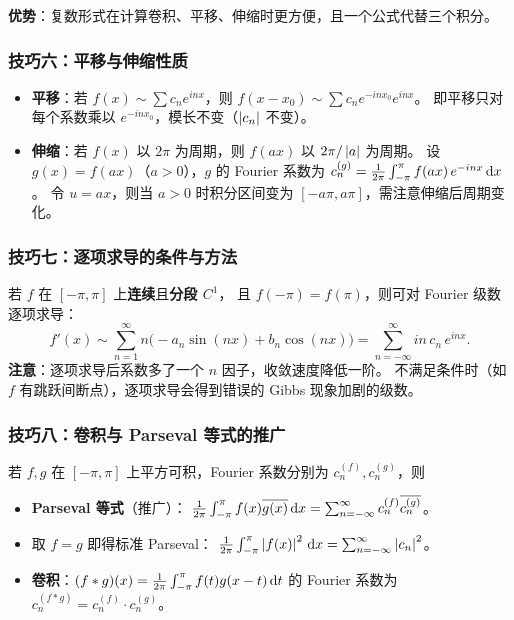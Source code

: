 \documentclass{ctexart}
\begin{document}
\textbf{优势}：复数形式在计算卷积、平移、伸缩时更方便，且一个公式代替三个积分。

\subsubsection*{技巧六：平移与伸缩性质}
\begin{itemize}
  \item \textbf{平移}：若 $f(x) \sim \sum c_n e^{inx}$，则
    $f(x - x_0) \sim \sum c_n e^{-inx_0} e^{inx}$。
    即平移只对每个系数乘以 $e^{-inx_0}$，模长不变（$\left| c_n \right|$ 不变）。
  \item \textbf{伸缩}：若 $f(x)$ 以 $2\pi$ 为周期，则 $f(ax)$ 以 $2\pi/\left| a \right|$ 为周期。
    设 $g(x) = f(ax)$（$a > 0$），$g$ 的 Fourier 系数为
    $c_n^{(g)} = \frac{1}{2\pi}\int_{-\pi}^{\pi} f(ax)\,e^{-inx}\,\mathrm{d} x$。
    令 $u = ax$，则当 $a > 0$ 时积分区间变为 $[-a\pi, a\pi]$，需注意伸缩后周期变化。
\end{itemize}

\subsubsection*{技巧七：逐项求导的条件与方法}
若 $f$ 在 $[-\pi,\pi]$ 上\textbf{连续}且\textbf{分段 $C^1$}，
且 $f(-\pi) = f(\pi)$，则可对 Fourier 级数逐项求导：
\[
  f'(x) \sim \sum_{n=1}^{\infty} n\bigl(-a_n\sin(nx) + b_n\cos(nx)\bigr)
  = \sum_{n=-\infty}^{\infty} in\,c_n\,e^{inx}.
\]
\textbf{注意}：逐项求导后系数多了一个 $n$ 因子，收敛速度降低一阶。
不满足条件时（如 $f$ 有跳跃间断点），逐项求导会得到错误的 Gibbs 现象加剧的级数。

\subsubsection*{技巧八：卷积与 Parseval 等式的推广}
若 $f, g$ 在 $[-\pi,\pi]$ 上平方可积，Fourier 系数分别为 $c_n^{(f)}, c_n^{(g)}$，则
\begin{itemize}
  \item \textbf{Parseval 等式}（推广）：
    $\frac{1}{2\pi}\int_{-\pi}^{\pi} f(x)\overline{g(x)} \,\mathrm{d} x = \sum_{n=-\infty}^{\infty} c_n^{(f)}\overline{c_n^{(g)}}$。
  \item 取 $f = g$ 即得标准 Parseval：
    $\frac{1}{2\pi}\int_{-\pi}^{\pi} \left| f(x) \right|^2 \,\mathrm{d} x = \sum_{n=-\infty}^{\infty} \left| c_n \right|^2$。
  \item \textbf{卷积}：$(f * g)(x) = \frac{1}{2\pi}\int_{-\pi}^{\pi} f(t)g(x-t)\,\mathrm{d} t$
    的 Fourier 系数为 $c_n^{(f*g)} = c_n^{(f)} \cdot c_n^{(g)}$。
\end{itemize}
\end{document}
